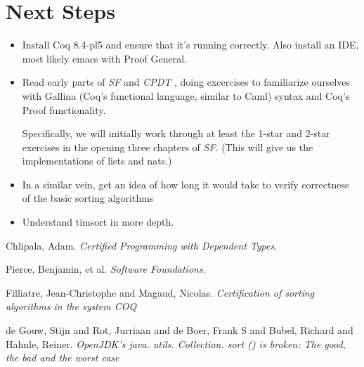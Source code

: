 \documentclass{article}
\begin{document}
\section{Next Steps}
\begin{itemize}
  \item
    Install Coq 8.4-pl5 and ensure that it's running correctly.
    Also install an IDE, most likely emacs with Proof General.
  \item
    Read early parts of \emph{SF} \cite{sf} and \emph{CPDT} \cite{cpdt},
    doing excercises to familiarize ourselves with Gallina (Coq's functional
    language, similar to Caml) syntax and Coq's Proof functionality.

    Specifically, we will initially work through at least the 1-star and
    2-star exercises in the opening three chapters of \emph{SF}.
    (This will give us the implementations of lists and nats.)
        \item In a similar vein, get an idea of how long it would take to verify correctness of the basic sorting algorithms 
    \item Understand timsort in more depth.
\end{itemize}

\begin{thebibliography}{xx}
    Chlipala, Adam. \emph{Certified Programming with Dependent Types}.

    Pierce, Benjamin, et al. \emph{Software Foundations}.
    
    Filliatre, Jean-Christophe and Magaud, Nicolas. \emph{Certification of sorting algorithms in the system COQ}
    
    de Gouw, Stijn and Rot, Jurriaan and de Boer, Frank S and Bubel, Richard and Hahnle, Reiner. \emph{OpenJDK’s java. utils. Collection. sort () is broken: The good, the bad and the worst case}
\end{thebibliography}
\end{document}
